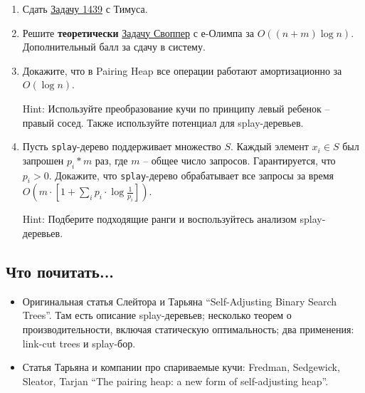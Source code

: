 \begin{enumerate}

  \item Сдать \href{http://acm.timus.ru/problem.aspx?space=1&num=1439}
{Задачу 1439} с Тимуса.

  \item Решите \textbf{теоретически}  \href{http://www.e-olimp.com/problems/689}
{Задачу Своппер} с е-Олимпа за $O((n + m) \log n)$. Дополнительный балл за сдачу
в систему.

  \item Докажите, что в Pairing Heap все операции работают амортизационно за 
$O(\log n)$.

Hint: Используйте преобразование кучи по принципу левый ребенок -- правый сосед. Также
используйте потенциал для splay-деревьев.

  \item Пусть \texttt{splay}-дерево поддерживает множество $S$. Каждый элемент 
$x_i \in S$ был запрошен $p_i * m$ раз, где $m$ -- общее число запросов. 
Гарантируется, что $p_i > 0$. Докажите, что \texttt{splay}-дерево обрабатывает
все запросы за время $O(m \cdot \left[ 1 + \sum_{i} p_i \cdot \log \frac{1}{p_i} 
\right])$.

Hint: Подберите подходящие ранги и воспользуйтесь анализом splay-деревьев.

\end{enumerate}

\subsection{Что почитать...}

\begin{itemize}
  
  \item Оригинальная статья Слейтора и Тарьяна ``Self-Adjusting Binary Search Trees''.
  Там есть описание splay-деревьев; несколько теорем о производительности, включая
  статическую оптимальность; два применения: link-cut trees и splay-бор.
  
  \item Статья Тарьяна и компании про спариваемые кучи: Fredman, Sedgewick, 
  Sleator, Tarjan ``The pairing heap: a new form of self-adjusting heap''.

\end{itemize}

\clearpage
